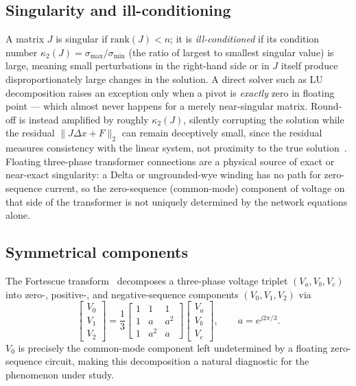 \documentclass[conference]{IEEEtran}
\begin{document}
\subsection{Singularity and ill-conditioning}
A matrix $J$ is singular if $\mathrm{rank}(J) < n$; it is
\emph{ill-conditioned} if its condition number $\kappa_2(J) =
\sigma_{\max}/\sigma_{\min}$ (the ratio of largest to smallest singular
value) is large, meaning small perturbations in the right-hand side or in
$J$ itself produce disproportionately large changes in the solution. A
direct solver such as LU decomposition raises an exception only when a
pivot is \emph{exactly} zero in floating point --- which almost never
happens for a merely near-singular matrix. Round-off is instead amplified
by roughly $\kappa_2(J)$, silently corrupting the solution while the
residual $\|J\Delta x + F\|_2$ can remain deceptively small, since the
residual measures consistency with the linear system, not proximity to the
true solution~\cite{golub2013matrix}. Floating three-phase transformer
connections are a physical source of exact or near-exact singularity: a
Delta or ungrounded-wye winding has no path for zero-sequence current, so
the zero-sequence (common-mode) component of voltage on that side of the
transformer is not uniquely determined by the network equations alone.

\subsection{Symmetrical components}
The Fortescue transform~\cite{fortescue1918method} decomposes a three-phase
voltage triplet $(V_a, V_b, V_c)$ into zero-, positive-, and
negative-sequence components $(V_0, V_1, V_2)$ via
\begin{equation}
\begin{bmatrix} V_0 \\ V_1 \\ V_2 \end{bmatrix}
= \frac{1}{3}
\begin{bmatrix} 1 & 1 & 1 \\ 1 & a & a^2 \\ 1 & a^2 & a \end{bmatrix}
\begin{bmatrix} V_a \\ V_b \\ V_c \end{bmatrix}, \qquad a = e^{j2\pi/3}.
\label{eq:fortescue}
\end{equation}
$V_0$ is precisely the common-mode component left undetermined by a
floating zero-sequence circuit, making this decomposition a natural
diagnostic for the phenomenon under study.
\end{document}
